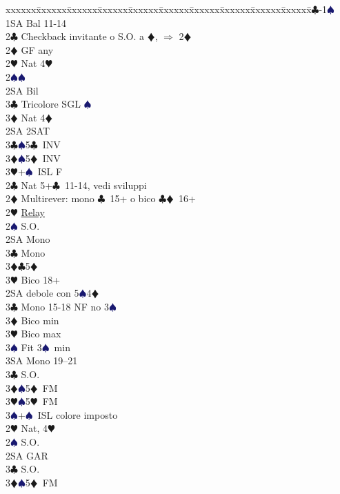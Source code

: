 \documentclass[a4paper,italian]{article}
\newcommand{\BC}{\textcolor{OliveGreen}{$\clubsuit$}}
\newcommand{\BD}{\textcolor{RedOrange}{$\vardiamondsuit$}}
\newcommand{\BH}{\textcolor{Red2}{$\varheartsuit${}}}
\newcommand{\BS}{\textcolor{MidnightBlue}{$\spadesuit${}}}
\newenvironment{bidtable}
{\begin{tabbing}

    xxxxxx\=xxxxxx\=xxxxxx\=xxxxxx\=xxxxxx\=xxxxxx\=xxxxxx\=xxxxxx\=xxxxxx\=xxxxxx\=\kill}
{\end{tabbing} }%
\begin{document}
\begin{multicols}{2}
    \begin{bidtable}
        1\BC-1\BS\+\\
        1SA \> Bal 11-14\+\\
        2\BC \> Checkback invitante o S.O. a \BD , $\Rightarrow$ 2\BD \\
        2\BD \> GF any\+\\
        2\BH \> Nat 4\BH \\
        2\BS {}\BS \\
        2SA \> Bil\\
        3\BC \> Tricolore SGL \BS \\
        3\BD \> Nat 4\BD \-\\
        2SA \> 2SAT\\
        3\BC {}\BS 5\BC\ INV\\
        3\BD {}\BS 5\BD\ INV\\
        3\BH {}+\BS\ ISL F\-\\
        2\BC \> Nat 5+\BC\ 11-14, vedi sviluppi\\
        2\BD \> Multirever: mono \BC\ 15+ o bico \BC \BD\ 16+\+\\
        2\BH \> \hyperref[multirever]{Relay}\\
        2\BS \> S.O.\+\\
        2SA\> Mono\\
        3\BC \> Mono\\
        3\BD {}\BC 5\BD \\
        3\BH \> Bico 18+\-\\
        2SA \> debole con 5\BS 4\BD \+\\
        3\BC \> Mono 15-18 NF no 3\BS\\
        3\BD \> Bico min\\
        3\BH \> Bico max\\
        3\BS \> Fit 3\BS\ min\\
        3SA \> Mono 19--21\-\\
        3\BC \> S.O.\\
        3\BD {}\BS 5\BD\ FM\\
        3\BH {}\BS 5\BH\ FM\\
        3\BS {}+\BS\ ISL colore imposto\-\\
        2\BH \> Nat, 4\BH \+\\
        2\BS \> S.O.\\
        2SA \> GAR\\
        3\BC \> S.O.\\
        3\BD {}\BS 5\BD\ FM\\

\end{bidtable}
\end{multicols}
\end{document}

